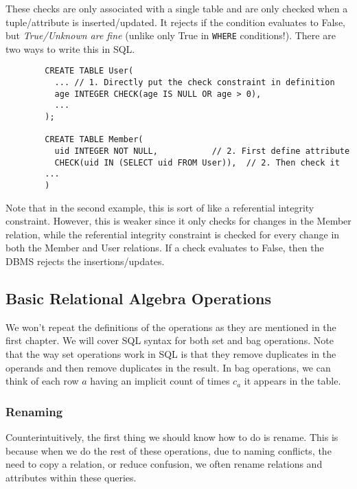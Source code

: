    \begin{definition}
      These checks are only associated with a single table and are only checked when a tuple/attribute is inserted/updated. It rejects if the condition evaluates to False, but \textit{True/Unknown are fine} (unlike only True in \texttt{WHERE} conditions!). There are two ways to write this in SQL. 
      \begin{lstlisting}
        CREATE TABLE User(
          ... // 1. Directly put the check constraint in definition
          age INTEGER CHECK(age IS NULL OR age > 0), 
          ...
        ); 

        CREATE TABLE Member(
          uid INTEGER NOT NULL,           // 2. First define attribute 
          CHECK(uid IN (SELECT uid FROM User)),  // 2. Then check it 
        ...
        )
      \end{lstlisting}
      Note that in the second example, this is sort of like a referential integrity constraint. However, this is weaker since it only checks for changes in the Member relation, while the referential integrity constraint is checked for every change in both the Member and User relations. If a check evaluates to False, then the DBMS rejects the insertions/updates. 
    \end{definition}

\subsection{Basic Relational Algebra Operations} 

  We won't repeat the definitions of the operations as they are mentioned in the first chapter. We will cover SQL syntax for both set and bag operations. Note that the way set operations work in SQL is that they remove duplicates in the operands and then remove duplicates in the result. In bag operations, we can think of each row $a$ having an implicit count of times $c_a$ it appears in the table.  

  \subsubsection{Renaming}
    
    Counterintuitively, the first thing we should know how to do is rename. This is because when we do the rest of these operations, due to naming conflicts, the need to copy a relation, or reduce confusion, we often rename relations and attributes within these queries. 

